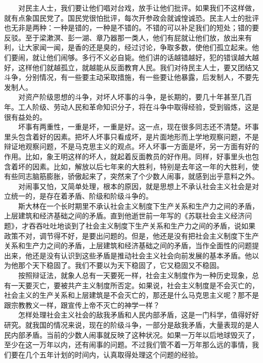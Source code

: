 \documentclass[cn,11pt,chinese]{elegantbook}
\begin{document}
　　对民主人士，我们要让他们唱对台戏，放手让他们批评。如果我们不这样做，就有点象国民党了。国民党很怕批评，每次开参政会就诚惶诚恐。民主人士的批评也无非是两种：一种是错的，一种是不错的。不错的可以补足我们的短处；错的要反驳。至于梁漱溟、彭一湖、章乃器那一类人，他们有屁就让他们放，放出来有利，让大家闻一闻，是香的还是臭的，经过讨论，争取多数，使他们孤立起来。他们要闹，就让他们闹够。多行不义必自毙。他们讲的话越错越好，犯的错误越大越好，这样他们就越孤立，就越能从反面教育人民。我们对待民主人士，要又团结又斗争，分别情况，有一些要主动采取措施，有一些要让他暴露，后发制人，不要先发制人。\\
　　对资产阶级思想的斗争，对坏人坏事的斗争，是长期的，要几十年甚至几百年。工人阶级、劳动人民和革命知识分子，将在斗争中取得经验，受到锻炼，这是很有益处的。\\
　　坏事有两重性，一重是坏，一重是好。这一点，现在很多同志还不清楚。坏事里头包含着好的因素。把坏人坏事只看成坏，是片面地形而上学地观察问题，不是辩证地观察问题，不是马克思主义的观点。坏人坏事一方面是坏，另一方面有好的作用。比如，象王明这样的坏人，就起着反面教员的好作用。同样，好事里头也包含着坏的因素。比如，解放以后七年来的大胜利，特别是去年这一年的大胜利，使有些同志脑筋膨胀，骄傲起来了，突然来了个少数人闹事，就感到出乎意料之外。\\
　　对闹事又怕，又简单处理，根本的原因，就是思想上不承认社会主义社会是对立统一的，是存在着矛盾、阶级和阶级斗争的。\\
　　斯大林在一个长时期里不承认社会主义制度下生产关系和生产力之间的矛盾，上层建筑和经济基础之间的矛盾。直到他逝世前一年写的《苏联社会主义经济问题》，才吞吞吐吐地谈到了社会主义制度下生产关系和生产力之间的矛盾，说如果政策不对，调节得不好，是要出问题的。但是，他还是没有把社会主义制度下生产关系和生产力之间的矛盾，上层建筑和经济基础之间的矛盾，当作全面性的问题提出来，他还是没有认识到这些矛盾是推动社会主义社会向前发展的基本矛盾。他以为他那个天下稳固了。我们不要以为天下稳固了，它又稳固又不稳固。\\
　　按照辩证法，就象人总有一天要死一样，社会主义制度作为一种历史现象，总有一天要灭亡，要被共产主义制度所否定。如果说，社会主义制度是不会灭亡的，社会主义的生产关系和上层建筑是不会灭亡的，那还是什么马克思主义呢？那不是跟宗教教义一样，跟宣传上帝不灭亡的神学一样？\\
　　怎样处理社会主义社会的敌我矛盾和人民内部矛盾，这是一门科学，值得好好研究。就我国的情况来说，现在的阶级斗争，一部分是敌我矛盾，大量表现的是人民内部矛盾。当前的少数人闹事就反映了这种状况。如果一万年以后地球毁灭了，至少在这一万年以内，还有闹事的问题。不过我们管不着一万年那么远的事情，我们要在几个五年计划的时间内，认真取得处理这个问题的经验。\\
\end{document}
